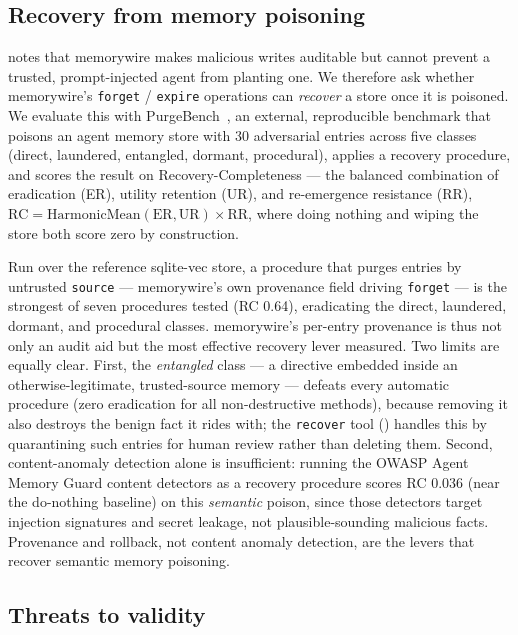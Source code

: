 \documentclass[11pt,letterpaper,twocolumn]{article}
\begin{document}
\subsection{Recovery from memory poisoning}
\label{sec:eval-recovery}

 notes that memorywire makes malicious writes auditable but cannot prevent a trusted, prompt-injected agent from planting one. We therefore ask whether memorywire's \texttt{forget} / \texttt{expire} operations can \emph{recover} a store once it is poisoned. We evaluate this with PurgeBench~\cite{purgebench}, an external, reproducible benchmark that poisons an agent memory store with 30 adversarial entries across five classes (direct, laundered, entangled, dormant, procedural), applies a recovery procedure, and scores the result on Recovery-Completeness --- the balanced combination of eradication (ER), utility retention (UR), and re-emergence resistance (RR), $\mathrm{RC} = \mathrm{HarmonicMean}(\mathrm{ER}, \mathrm{UR}) \times \mathrm{RR}$, where doing nothing and wiping the store both score zero by construction.

Run over the reference sqlite-vec store, a procedure that purges entries by untrusted \texttt{source} --- memorywire's own provenance field driving \texttt{forget} --- is the strongest of seven procedures tested (RC 0.64), eradicating the direct, laundered, dormant, and procedural classes. memorywire's per-entry provenance is thus not only an audit aid but the most effective recovery lever measured. Two limits are equally clear. First, the \emph{entangled} class --- a directive embedded inside an otherwise-legitimate, trusted-source memory --- defeats every automatic procedure (zero eradication for all non-destructive methods), because removing it also destroys the benign fact it rides with; the \texttt{recover} tool () handles this by quarantining such entries for human review rather than deleting them. Second, content-anomaly detection alone is insufficient: running the OWASP Agent Memory Guard content detectors as a recovery procedure scores RC 0.036 (near the do-nothing baseline) on this \emph{semantic} poison, since those detectors target injection signatures and secret leakage, not plausible-sounding malicious facts. Provenance and rollback, not content anomaly detection, are the levers that recover semantic memory poisoning.

\subsection{Threats to validity}
\label{sec:eval-threats}
\end{document}
